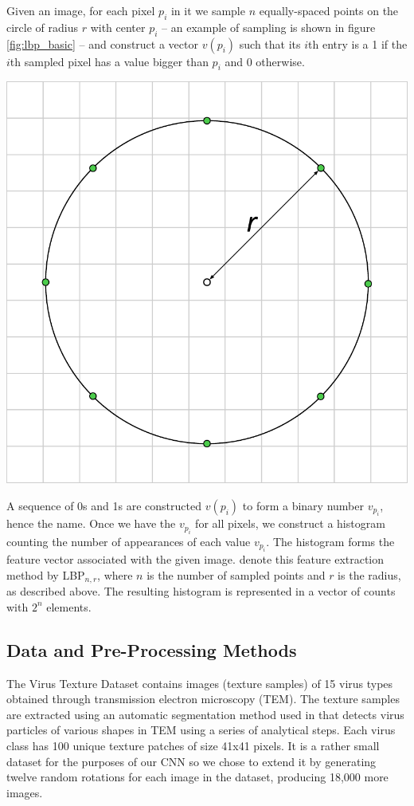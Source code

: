 \begin{multicols}{2}
Given an image, for each pixel $p_i$ in it we sample $n$ equally-spaced points on the circle of radius $r$ with center $p_i$ -- an example of sampling is shown in figure \ref{fig:lbp_basic} -- and construct a vector $v(p_i)$ such that its $i$th entry is a 1 if the $i$th sampled pixel has a value bigger than $p_i$ and 0 otherwise. 
\begin{Figure}
	\centering
	\includegraphics[width=0.5\linewidth]{images/lbp_basic.pdf}
	\label{fig:lbp_basic}
\end{Figure}
A sequence of 0s and 1s are constructed $v(p_i)$ to form a binary number $v_{p_i}$, hence the name. Once we have the $v_{p_i}$ for all pixels, we construct a histogram counting the number of appearances of each value $v_{p_i}$. The histogram forms the feature vector associated with the given image. \citet{kylberg2011virus} denote this feature extraction method by LBP$_{n, r}$, where $n$ is the number of sampled points and $r$ is the radius, as described above. The resulting histogram is represented in a vector of counts with $2^n$ elements. 

\subsection{Data and Pre-Processing Methods}
\label{text:dataset}
The Virus Texture Dataset contains images (texture samples) of 15 virus types obtained through transmission electron microscopy (TEM). The texture samples are extracted using an automatic segmentation method used in \citet{JMI:JMI3556} that detects virus particles of various shapes in TEM using a series of analytical steps. Each virus class has 100 unique texture patches of size 41x41 pixels. It is a rather small dataset for the purposes of our CNN so we chose to extend it by generating twelve random rotations for each image in the dataset, producing 18,000 more images.


\end{multicols}
